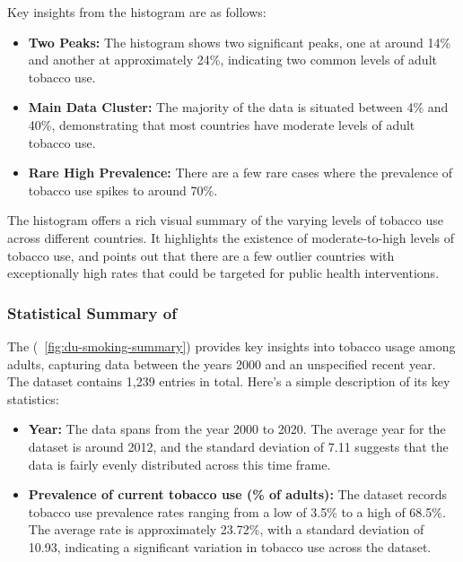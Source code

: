             Key insights from the histogram are as follows:

            \begin{itemize}
                \item \textbf{Two Peaks:} The histogram shows two significant peaks, one at around 14\% and another at approximately 24\%, indicating two common levels of adult tobacco use.

                \item \textbf{Main Data Cluster:} The majority of the data is situated between 4\% and 40\%, demonstrating that most countries have moderate levels of adult tobacco use.

                \item \textbf{Rare High Prevalence:} There are a few rare cases where the prevalence of tobacco use spikes to around 70\%.
            \end{itemize}

            The histogram offers a rich visual summary of the varying levels of tobacco use across different countries. It highlights the existence of moderate-to-high levels of tobacco use, and points out that there are a few outlier countries with exceptionally high rates that could be targeted for public health interventions.

            \subsubsection{Statistical Summary of \dsSmoking}

                The \textit{\dsSmoking} (\figurename~\ref{fig:du-smoking-summary}) provides key insights into tobacco usage among adults, capturing data between the years 2000 and an unspecified recent year. The dataset contains 1,239 entries in total. Here's a simple description of its key statistics:

                \begin{itemize}
                        \item \textbf{Year:} The data spans from the year 2000 to 2020. The average year for the dataset is around 2012, and the standard deviation of 7.11 suggests that the data is fairly evenly distributed across this time frame.

                        \item \textbf{Prevalence of current tobacco use (\% of adults):} The dataset records tobacco use prevalence rates ranging from a low of 3.5\% to a high of 68.5\%. The average rate is approximately 23.72\%, with a standard deviation of 10.93, indicating a significant variation in tobacco use across the dataset.
                \end{itemize}

